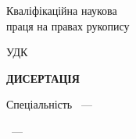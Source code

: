 \thispagestyle{empty}%
\begin{center}%
\thesisOrganization

\thesisMON

\thesisOrganization

\thesisMON

\end{center}%

\vspace{0pt plus4fill} %
\begin{flushright}%
  \begin{minipage}[b]{0.4\linewidth}
    \begin{flushleft}%
Кваліфікаційна наукова \\
праця на правах рукопису
    \end{flushleft}%
  \end{minipage}
\end{flushright}%

\vspace{0pt plus3fill} %
\begin{center}%
{\textbf{\MakeUppercase{\thesisAuthor}} }
\end{center}%

\vspace{0pt plus1fill} %
\begin{flushright}%
  \begin{minipage}[b]{0.4\linewidth}
    \begin{flushleft}%
       УДК \thesisUdk
    \end{flushleft}%
  \end{minipage}
\end{flushright}%

\vspace{0pt plus1fill} %
\begin{center}%
{\textbf{ДИСЕРТАЦІЯ} }
\end{center}%
%

\vspace{0pt plus1fill} %
\begin{center}%
\MakeUppercase{
\thesisTitle}

\vspace{0pt plus4fill} %
{%
Спеціальність \thesisSpecialtyNumber~---~
\thesisSpecialtyTitle

\thesisKnowledgeNumber~---~\thesisKnowledgeTitle
}
\end{center}%

